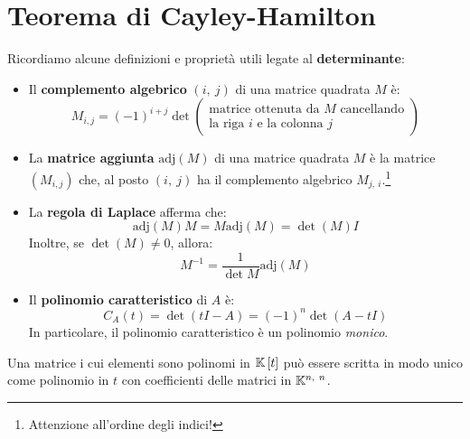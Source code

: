 \section{Teorema di Cayley-Hamilton}
\begin{remember}
	Ricordiamo alcune definizioni e proprietà utili legate al \textbf{determinante}:
	\begin{itemize}
		\item Il \textbf{complemento algebrico} $\left(i,\ j\right)$ di una matrice quadrata $M$ è:
		\begin{equation}
			M_{i,j}=\left(-1\right)^{i+j}\det\left(\begin{array}{c}
				\text{matrice ottenuta da }M \text{ cancellando}\\
				\text{la riga }i\text{ e la colonna }j
			\end{array}\right)
		\end{equation}
	\item La \textbf{matrice aggiunta} $\mathrm{adj}\left(M\right)$ di una matrice quadrata $M$ è la matrice $\left(M_{i,j}\right)$ che, al posto $\left(i,\ j\right)$ ha il complemento algebrico $M_{j,\ i}$.\footnote{Attenzione all'ordine degli indici!}
	\item La \textbf{regola di Laplace} afferma che:
	\begin{equation}
		\mathrm{adj}\left(M\right)M=M\mathrm{adj}\left(M\right)=\det\left(M\right)I
	\end{equation}
	Inoltre, se $\det\left(M\right)\neq 0$, allora:
	\begin{equation}
		M^{-1}=\frac{1}{\det M}\mathrm{adj}\left(M\right)
	\end{equation}
\item Il \textbf{polinomio caratteristico} di $A$ è:
\begin{equation}
	C_A\left(t\right)=\det\left(tI-A\right)=\left(-1\right)^n\det\left(A-tI\right)
\end{equation}
In particolare, il polinomio caratteristico è un polinomio \textit{monico}.
	\end{itemize}
\vspace{-3mm}
\end{remember}
\begin{observe}\label{polinomicoeffmatrisci}
Una matrice i cui elementi sono polinomi in $\mathbb{K}\left[t\right]$ può essere scritta in modo unico come polinomio in $t$ con coefficienti delle matrici in $\kamp^{n,\ n}$.
\end{observe}
